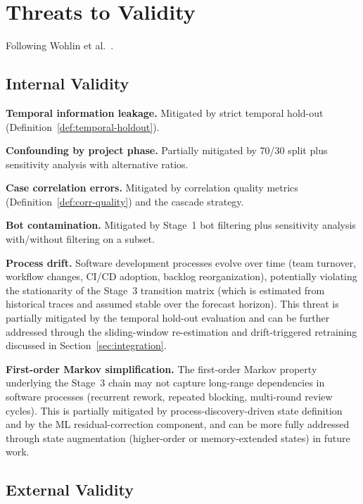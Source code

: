 \section{Threats to Validity}
\label{sec:threats}

Following Wohlin et al.~\cite{wohlin2012experimentation}.

\subsection{Internal Validity}
\label{sec:threats-internal}

\textbf{Temporal information leakage.} Mitigated by strict temporal
hold-out (Definition~\ref{def:temporal-holdout}).

\textbf{Confounding by project phase.} Partially mitigated by 70/30 split
plus sensitivity analysis with alternative ratios.

\textbf{Case correlation errors.} Mitigated by correlation quality
metrics (Definition~\ref{def:corr-quality}) and the cascade strategy.

\textbf{Bot contamination.} Mitigated by Stage~1 bot filtering plus
sensitivity analysis with/without filtering on a subset.

\textbf{Process drift.} Software development processes evolve over time
(team turnover, workflow changes, CI/CD adoption, backlog reorganization),
potentially violating the stationarity of the Stage~3 transition matrix
(which is estimated from historical traces and assumed stable over the
forecast horizon). This threat is partially mitigated by the temporal
hold-out evaluation and can be further addressed through the sliding-window
re-estimation and drift-triggered retraining discussed in
Section~\ref{sec:integration}.

\textbf{First-order Markov simplification.} The first-order Markov property
underlying the Stage~3 chain may not capture long-range dependencies in software
processes (recurrent rework, repeated blocking, multi-round review cycles).
This is partially mitigated by process-discovery-driven state definition and
by the ML residual-correction component, and can be more fully addressed
through state augmentation (higher-order or memory-extended states) in
future work.


\subsection{External Validity}
\label{sec:threats-external}

